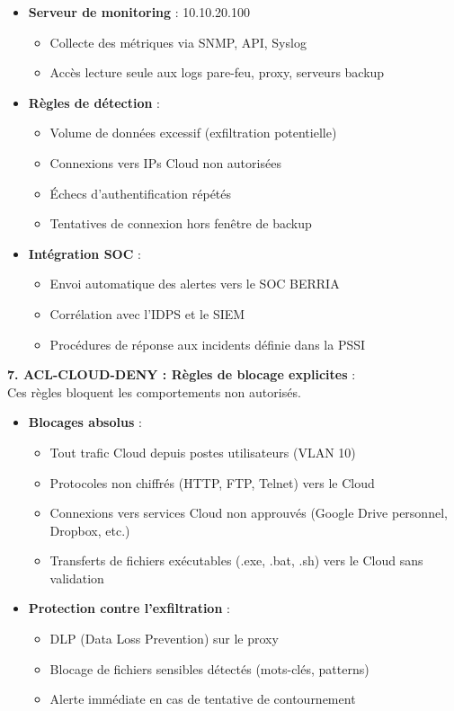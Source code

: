 \begin{itemize}
  \item \textbf{Serveur de monitoring} : 10.10.20.100
  \begin{itemize}
    \item Collecte des métriques via SNMP, API, Syslog
    \item Accès lecture seule aux logs pare-feu, proxy, serveurs backup
  \end{itemize}
  
  \item \textbf{Règles de détection} :
  \begin{itemize}
    \item Volume de données excessif (exfiltration potentielle)
    \item Connexions vers IPs Cloud non autorisées
    \item Échecs d'authentification répétés
    \item Tentatives de connexion hors fenêtre de backup
  \end{itemize}
  
  \item \textbf{Intégration SOC} :
  \begin{itemize}
    \item Envoi automatique des alertes vers le SOC BERRIA
    \item Corrélation avec l'IDPS et le SIEM
    \item Procédures de réponse aux incidents définie dans la PSSI
  \end{itemize}
\end{itemize}

\medskip

\noindent \textbf{7. ACL-CLOUD-DENY : Règles de blocage explicites} :\\
Ces règles bloquent les comportements non autorisés.

\begin{itemize}
  \item \textbf{Blocages absolus} :
  \begin{itemize}
    \item Tout trafic Cloud depuis postes utilisateurs (VLAN 10)
    \item Protocoles non chiffrés (HTTP, FTP, Telnet) vers le Cloud
    \item Connexions vers services Cloud non approuvés (Google Drive personnel, Dropbox, etc.)
    \item Transferts de fichiers exécutables (.exe, .bat, .sh) vers le Cloud sans validation
  \end{itemize}
  
  \item \textbf{Protection contre l'exfiltration} :
  \begin{itemize}
    \item DLP (Data Loss Prevention) sur le proxy
    \item Blocage de fichiers sensibles détectés (mots-clés, patterns)
    \item Alerte immédiate en cas de tentative de contournement
  \end{itemize}
\end{itemize}

